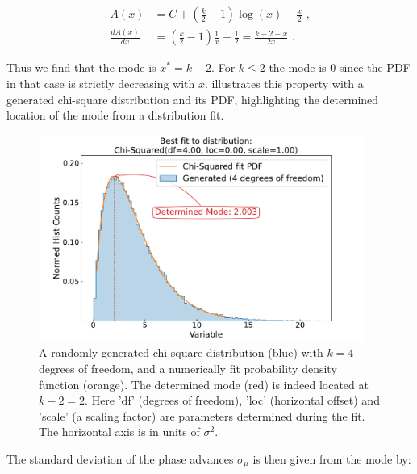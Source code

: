 \begin{equation}
	\begin{aligned}
        A(x)              &= C + \left( \frac{k}{2} - 1 \right) \log(x) - \frac{x}{2} \text{ ,} \\
        \frac{d A(x)}{dx} &= \left( \frac{k}{2} - 1 \right) \frac{1}{x} - \frac{1}{2} = \frac{k - 2 - x}{2x} \text{ .}
	\end{aligned}	
    \label{equation:chi2_pdf_mode_proof}
\end{equation}

Thus we find that the mode is \(x^{*} = k - 2\).
For \(k \leq 2\) the mode is 0 since the PDF in that case is strictly decreasing with \(x\).
 illustrates this property with a generated chi-square distribution and its PDF, highlighting the determined location of the mode from a distribution fit.
\newline

\begin{figure}[!htb]
    \centering
    \includegraphics*[width=0.95\textwidth]{Figures/Other_Studies/phase_chisquare_demo_fit.pdf}
    \caption{A randomly generated chi-square distribution (\textcolor{mplblue}{blue}) with \(k = 4\) degrees of freedom, and a numerically fit probability density function (\textcolor{mplorange}{orange}). The determined mode (\textcolor{mplred}{red}) is indeed located at \(k - 2 = 2\). Here 'df' (degrees of freedom), 'loc' (horizontal offset) and 'scale' (a scaling factor) are parameters determined during the fit. The horizontal axis is in units of \(\sigma^2\).}
    \label{figure:chisquare_demo_fit}
\end{figure}

The standard deviation of the phase advances \(\sigma_{\mu}\) is then given from the mode by:


